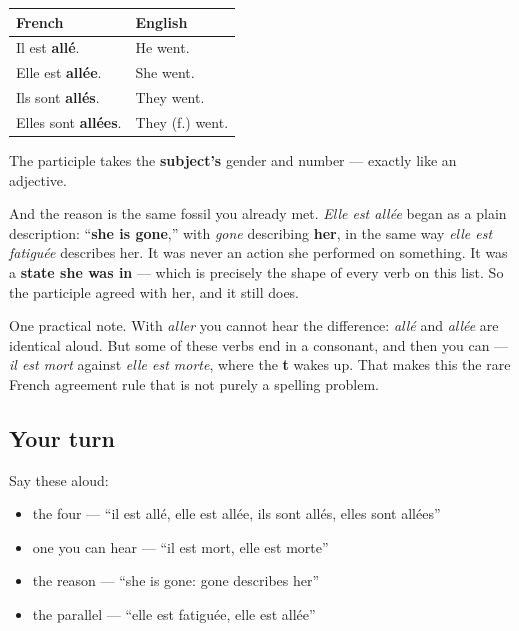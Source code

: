 \begin{grammarlens}[title={Grammar Lens: it agrees with the subject}]
\noindent
\begin{tabularx}{\linewidth}{@{}>{\raggedright\arraybackslash}X>{\raggedright\arraybackslash}X@{}}
\toprule
\textbf{French} & \textbf{English} \\
\midrule
Il est \textbf{allé}. & He went. \\
Elle est \textbf{allée}. & She went. \\
Ils sont \textbf{allés}. & They went. \\
Elles sont \textbf{allées}. & They (f.) went. \\
\bottomrule
\end{tabularx}

The participle takes the \textbf{subject's} gender and number — exactly like an adjective.

And the reason is the same fossil you already met. \emph{Elle est allée} began as a plain description: \textquotedblleft{}\textbf{she is gone},\textquotedblright{} with \emph{gone} describing \textbf{her}, in the same way \emph{elle est fatiguée} describes her. It was never an action she performed on something. It was a \textbf{state she was in} — which is precisely the shape of every verb on this list. So the participle agreed with her, and it still does.

One practical note. With \emph{aller} you cannot hear the difference: \emph{allé} and \emph{allée} are identical aloud. But some of these verbs end in a consonant, and then you can — \emph{il est mort} against \emph{elle est morte}, where the \textbf{t} wakes up. That makes this the rare French agreement rule that is not purely a spelling problem.
\end{grammarlens}

\subsection*{Your turn}
Say these aloud:

\begin{itemize}
\raggedright
  \item the four — \textquotedblleft{}il est allé, elle est allée, ils sont allés, elles sont allées\textquotedblright{}
  \item one you can hear — \textquotedblleft{}il est mort, elle est morte\textquotedblright{}
  \item the reason — \textquotedblleft{}she is gone: gone describes her\textquotedblright{}
  \item the parallel — \textquotedblleft{}elle est fatiguée, elle est allée\textquotedblright{}
\end{itemize}

